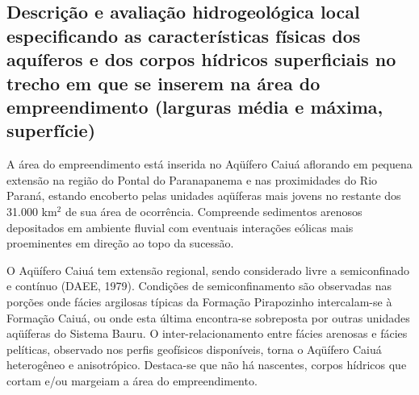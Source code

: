 \subsection{Descrição e avaliação hidrogeológica local especificando as características físicas dos aquíferos e dos corpos hídricos superficiais no trecho em que se inserem na área do empreendimento (larguras média e máxima, superfície)}

A  área do empreendimento está inserida no Aqüífero Caiuá aflorando em pequena extensão na região do Pontal do Paranapanema e nas proximidades do Rio Paraná, estando encoberto pelas unidades aqüíferas mais jovens no restante dos 31.000 km$^2$ de sua área de ocorrência. Compreende sedimentos arenosos depositados em ambiente fluvial com eventuais interações eólicas mais proeminentes em direção ao topo da sucessão.

O Aqüífero Caiuá tem extensão regional, sendo considerado livre a semiconfinado e contínuo (DAEE, 1979). Condições de semiconfinamento são observadas nas porções onde fácies argilosas típicas da Formação Pirapozinho intercalam-se à Formação Caiuá, ou onde esta última encontra-se sobreposta por outras unidades aqüíferas do Sistema Bauru. O inter-relacionamento entre fácies arenosas e fácies pelíticas, observado nos perfis geofísicos disponíveis, torna o Aqüífero Caiuá heterogêneo e anisotrópico.
Destaca-se que não há nascentes, corpos hídricos que cortam e/ou margeiam a área do empreendimento.

